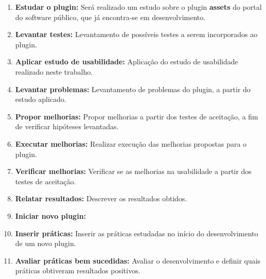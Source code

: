 \begin{enumerate}
\item \textbf{Estudar o plugin:} Será realizado um estudo sobre o plugin \textbf{assets} do portal do software público, que já encontra-se em desenvolvimento.
\item \textbf{Levantar testes:} Levantamento de possíveis testes a serem incorporados ao plugin.
\item \textbf{Aplicar estudo de usabilidade:} Aplicação do estudo de usabilidade realizado neste trabalho.
\item \textbf{Levantar problemas:} Levantamento de problemas do plugin, a partir do estudo aplicado.
\item  \textbf{Propor melhorias:} Propor melhorias a partir dos testes de aceitação, a fim de verificar hipóteses levantadas.
\item \textbf{Executar melhorias:} Realizar execução das melhorias propostas para o plugin.
\item \textbf{Verificar melhorias:} Verificar se as melhorias na usabilidade a partir dos testes de aceitação.
\item \textbf{Relatar resultados:} Descrever os resultados obtidos.
\item \textbf{Iniciar novo plugin:} 
\item \textbf{Inserir práticas:} Inserir as práticas estudadas no início do desenvolvimento de um novo plugin.
\item \textbf{Avaliar práticas bem sucedidas:} Avaliar o desenvolvimento e definir quais práticas obtiveram resultados positivos.

\end{enumerate}


